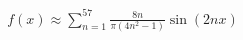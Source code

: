 \documentclass[preview]{standalone}
\begin{document}
\begin{align*}
f(x) \approx \sum_{n=1}^{57} \frac{8n}{\pi(4n^2-1)} \sin(2nx)
\end{align*}
\end{document}
